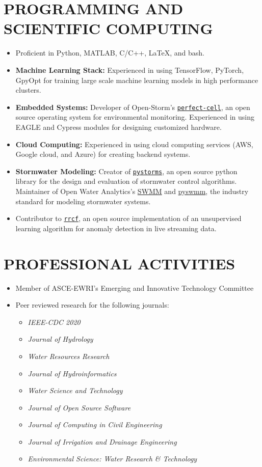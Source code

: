 \documentclass{my_cv}
\begin{document}
\section*{PROGRAMMING AND SCIENTIFIC COMPUTING}
\begin{itemize}
	\item Proficient in Python, MATLAB, C/C++, \LaTeX, and bash.
	\item \textbf{Machine Learning Stack:} Experienced in using TensorFlow, PyTorch, GpyOpt for training large scale machine learning models in high performance clusters. 
	\item \textbf{Embedded Systems:} Developer of Open-Storm's \href{https://github.com/open-storm/perfect-cell}{\texttt{perfect-cell}}, an open source operating system for environmental monitoring. Experienced in using EAGLE and Cypress modules for designing customized hardware.  
	\item \textbf{Cloud Computing:} Experienced in using cloud computing services (AWS, Google cloud, and Azure) for creating backend systems. 
	\item \textbf{Stormwater Modeling:} Creator of \href{https://klabum.github.io/pystorms/}{\texttt{pystorms}}, an open source python library for the design and evaluation of stormwater control algorithms. Maintainer of Open Water Analytics's \href{https://github.com/OpenWaterAnalytics/Stormwater-Management-Model}{SWMM} and \href{https://github.com/OpenWaterAnalytics/pyswmm}{pyswmm}, the industry standard for modeling stormwater systems. 
	\item Contributor to \href{https://github.com/kLabUM/rrcf}{\texttt{rrcf}}, an open source implementation of an unsupervised learning algorithm for anomaly detection in live streaming data. 
\end{itemize}


\section*{PROFESSIONAL ACTIVITIES}
\begin{itemize}
	\item Member of ASCE-EWRI's Emerging and Innovative Technology Committee
	\item Peer reviewed research for the following journals: 
	\begin{itemize}
		\item \textit{IEEE-CDC 2020}
		\item \textit{Journal of Hydrology}
		\item \textit{Water Resources Research}
		\item \textit{Journal of Hydroinformatics}
		\item \textit{Water Science and Technology}
		\item \textit{Journal of Open Source Software}
		\item \textit{Journal of Computing in Civil Engineering}
		\item \textit{Journal of Irrigation and Drainage Engineering}
		\item \textit{Environmental Science: Water Research \& Technology}
	\end{itemize}
\end{itemize}
\end{document}
